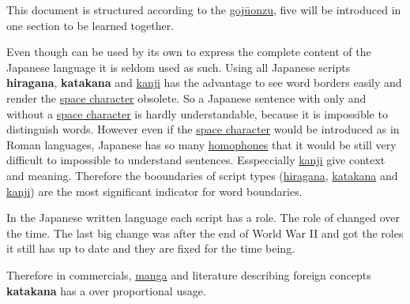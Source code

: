 

This document is structured according to the \hyperref[sec:Gojuonzu]{gojūonzu},
five \textbf{\jtopic} will be introduced in one section to be learned together.


Even though \textbf{\jtopic} can be used by its own to express the complete
content of the Japanese language it is seldom used as such. Using all Japanese
scripts \textbf{hiragana}, \textbf{katakana} and \hyperref[sec:Kanji]{kanji}
has the advantage to see word borders easily and render the
\hyperref[sec:SpaceCharacter]{space character} obsolete. So a Japanese
\textbf{\jtopic} sentence with \textbf{\jtopic} only and without a
\hyperref[sec:SpaceCharacter]{space character} is hardly understandable,
because it is impossible to distinguish words. However even if the
\hyperref[sec:SpaceCharacter]{space character} would be introduced as in Roman
languages, Japanese has so many \hyperref[sec:Homophone]{homophones} that it
would be still very difficult to impossible to understand sentences.
Esspeccially \hyperref[sec:Kanji]{kanji} give context and meaning. Therefore
the booundaries of script types (\hyperref[sec:Hiragana]{hiragana},
\hyperref[sec:Katakana]{katakana} and \hyperref[sec:Kanji]{kanji}) are
the most significant indicator for word boundaries.


\label{sec:role}

In the Japanese written language each script has a role. The role of
\textbf{\jtopic} changed over the time. The last big change was after the end
of World War II and \textbf{\jtopic} got the roles it still has up to date and
they are fixed for the time being.

\bigskip



\medskip


Therefore in commercials, \hyperref[sec:Manga]{manga} and literature describing
foreign concepts \textbf{katakana} has a over proportional usage.



%

